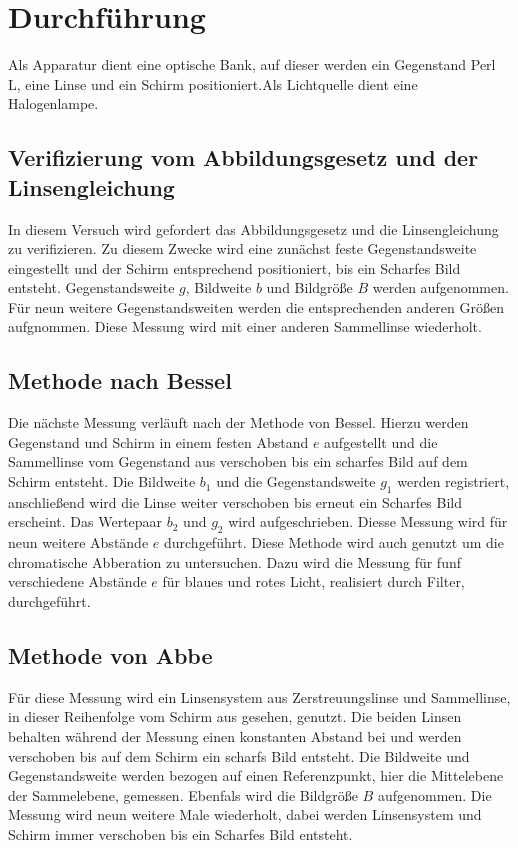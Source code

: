 \section{Durchführung}
\label{sec:Durchführung}
Als Apparatur dient eine optische Bank, auf dieser werden ein Gegenstand Perl L, eine Linse und ein Schirm
positioniert.Als Lichtquelle dient eine Halogenlampe.
\subsection{Verifizierung vom Abbildungsgesetz und der Linsengleichung}
In diesem Versuch wird gefordert das Abbildungsgesetz und die Linsengleichung zu verifizieren.
Zu diesem Zwecke wird eine zunächst feste Gegenstandsweite eingestellt und der Schirm entsprechend
positioniert, bis ein Scharfes Bild entsteht. Gegenstandsweite $g$, Bildweite $b$ und Bildgröße $B$ werden
aufgenommen. Für neun weitere Gegenstandsweiten werden die entsprechenden anderen Größen aufgnommen.
Diese Messung wird mit einer anderen Sammellinse wiederholt.
\subsection{Methode nach Bessel}
Die nächste Messung verläuft nach der Methode von Bessel. Hierzu werden Gegenstand und Schirm
in einem festen Abstand $e$ aufgestellt und die Sammellinse vom Gegenstand aus verschoben bis ein scharfes Bild
auf dem Schirm entsteht. Die Bildweite $b_\mathrm{1}$ und die Gegenstandsweite $g_\mathrm{1}$ werden
registriert, anschließend wird die Linse weiter verschoben bis erneut ein Scharfes Bild erscheint.
Das Wertepaar $b_\mathrm{2}$ und $g_\mathrm{2}$ wird aufgeschrieben. Diesse Messung wird für neun
weitere Abstände $e$ durchgeführt.
Diese Methode wird auch genutzt um die chromatische Abberation zu untersuchen. Dazu wird die Messung
für funf verschiedene Abstände $e$ für blaues und rotes Licht, realisiert durch Filter, durchgeführt.
\subsection{Methode von Abbe}
Für diese Messung wird ein Linsensystem aus Zerstreuungslinse und Sammellinse, in dieser Reihenfolge
vom Schirm aus gesehen, genutzt. Die beiden Linsen behalten während der Messung einen konstanten Abstand
bei und werden verschoben bis auf dem Schirm ein scharfs Bild entsteht. Die Bildweite und Gegenstandsweite
werden bezogen auf einen Referenzpunkt, hier die Mittelebene der Sammelebene, gemessen. Ebenfals wird die
Bildgröße $B$ aufgenommen. Die Messung wird neun weitere Male wiederholt, dabei werden Linsensystem und
Schirm immer verschoben bis ein Scharfes Bild entsteht.
